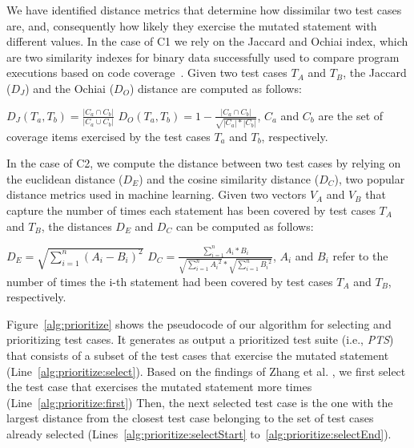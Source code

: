 We have identified distance metrics that determine how dissimilar two test cases are, and, consequently how likely they exercise the mutated statement with different values. In the case of C1 we rely on the Jaccard and Ochiai index, which are two similarity indexes for binary data successfully used to compare program executions based on code coverage~\cite{Zou:Ochiai:2019,Keller:Jaccard:2017,Briand:2019}. Given two test cases $T_A$ and $T_B$, the Jaccard  ($D_J$) and the Ochiai ($D_O$) distance are computed as follows:

$D_J(T_a,T_b)=\frac{|C_a \cap C_b|}{|C_a \cup C_b|}$ \hspace{5mm} $D_O(T_a,T_b)=1-\frac{|C_a \cap C_b|}{\sqrt{|C_a| * |C_b|}}$, 
$C_a$ and $C_b$ are the set of coverage items exercised by the test cases $T_a$ and $T_b$, respectively.

In the case of C2, we compute the distance between two test cases by relying on the euclidean distance ($D_E$) and the cosine similarity distance ($D_C$), two popular distance metrics used in machine learning. Given two vectors $V_A$ and $V_B$ that capture the number of times each statement has been covered by test cases $T_A$ and $T_B$, the distances $D_E$ and $D_C$ can be computed as follows:

$D_E=\sqrt{\sum_{i=1}^{n}(A_i-B_i)^2}$ 
$D_C= \frac{\sum_{i=1}^{n}A_i*B_i}{\sqrt{\sum_{i=1}^{n}{A_i}^2}*\sqrt{\sum_{i=1}^{n}{B_i}^2}}$,
$A_i$ and $B_i$ refer to the number of times the i-th statement had been covered by test cases $T_A$ and $T_B$, respectively.

Figure~\ref{alg:prioritize} shows the pseudocode of our algorithm for selecting and prioritizing test cases. It generates as output
a prioritized test suite (i.e., \emph{PTS}) that consists of a subset of the test cases that exercise the mutated statement (Line~\ref{alg:prioritize:select}).
Based on the findings of Zhang et al. \cite{zhang2013faster}, we first select the test case that exercises the mutated statement more times (Line~\ref{alg:prioritize:first}) 
Then, the next selected test case is the one with the largest distance from the closest test case belonging to the set of test cases already selected (Lines~\ref{alg:prioritize:selectStart} to~\ref{alg:prioritize:selectEnd}). 


